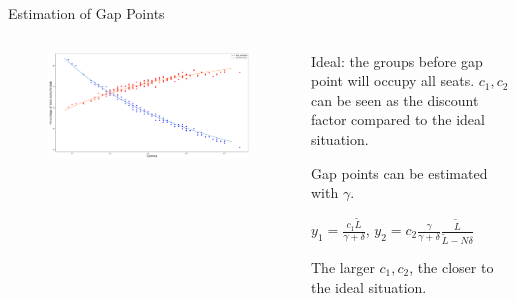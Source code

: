     \begin{frame}{Estimation of Gap Points}
      \scriptsize
      \vspace{-0.2cm}

      \begin{columns}
        \begin{column}{0.6\textwidth}
      \begin{figure}[ht]
        \centering
        \includegraphics[width = 1\textwidth]{./images/gamma.pdf}
    \end{figure}
  \end{column}

  \begin{column}{0.4\textwidth}
    Ideal: the groups before gap point will occupy all seats.
    $c_1, c_2$ can be seen as the discount factor compared to the ideal situation.

    Gap points can be estimated with $\gamma$.

    {\color{blue} $y_1 = \frac{c_1 \tilde{L}}{\gamma + \delta}$}, 
    {\color{red}  $y_2 = c_2 \frac{\gamma}{\gamma + \delta} \frac{\tilde{L}}{\tilde{L}-N \delta}$}

    The larger $c_1, c_2$, the closer to the ideal situation.
  \end{column}
  \end{columns}


\end{frame}
